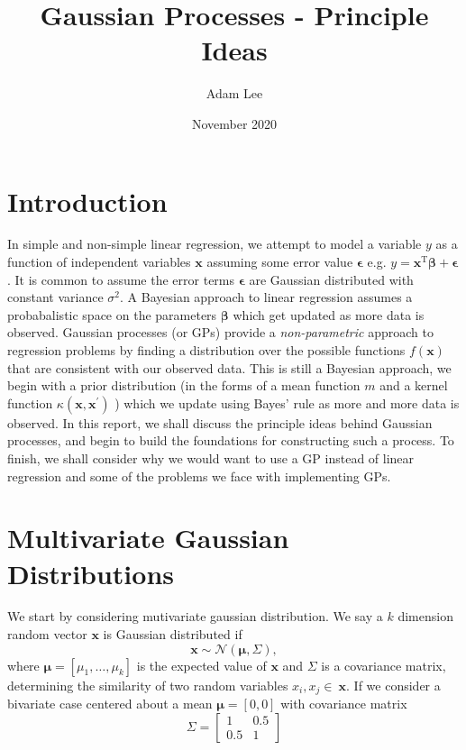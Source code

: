 \documentclass[10pt,a4paper, twocolumn, conference]{IEEEtran}
\author{Adam Lee}
\title{Gaussian Processes - Principle Ideas}
\date{November 2020}
\theoremstyle{own}
\theoremstyle{definition}
\theoremstyle{plain}
\begin{document}
\maketitle
\section{Introduction}
In simple and non-simple linear regression, we attempt to model a variable $y$ as a function of independent variables $\mathbf{x}$ assuming some error value $\boldsymbol\epsilon$ e.g. $y = \mathbf{x}^{\text{T}} \boldsymbol\beta + \boldsymbol\epsilon$. It is common to assume the error terms $\boldsymbol\epsilon$ are Gaussian distributed with constant variance $\sigma ^  2$. A Bayesian approach to linear regression assumes a probabalistic space on the parameters $\boldsymbol\beta$ which get updated as more data is observed. Gaussian processes (or GPs) provide a \textit{non-parametric} approach to regression problems by finding a distribution over the possible functions $f(\mathbf{x})$ that are consistent with our observed data. This is still a Bayesian approach, we begin with a prior distribution (in the forms of a mean function $m$ and a kernel function $\kappa \left( \mathbf{x}, \mathbf{x^\prime} \right) $ ) which we update using Bayes' rule as more and more data is observed. In this report, we shall discuss the principle ideas behind Gaussian processes, and begin to build the foundations for constructing such a process. To finish, we shall consider why we would want to use a GP instead of linear regression and some of the problems we face with implementing GPs.
\section{Multivariate Gaussian Distributions}
We start by considering mutivariate gaussian distribution. We say a $k$ dimension random vector $\mathbf{x}$ is Gaussian distributed if
\begin{equation}
\mathbf{x} \sim \mathcal{N}( \boldsymbol\mu, \Sigma ),
\end{equation}
where $\boldsymbol\mu = [\mu_1, \ldots, \mu_k]$ is the expected value of $\mathbf{x}$ and $\Sigma$ is a covariance matrix, determining the similarity of two random variables $x_i, x_j\in~\mathbf{x}$. If we consider a bivariate case centered about a mean $\boldsymbol\mu = [0,0]$ with covariance matrix
\begin{equation}
\Sigma = \left[ \begin{matrix}
1 & 0.5 \\ 0.5 & 1 
\end{matrix} \right]
\end{equation}
\end{document}
